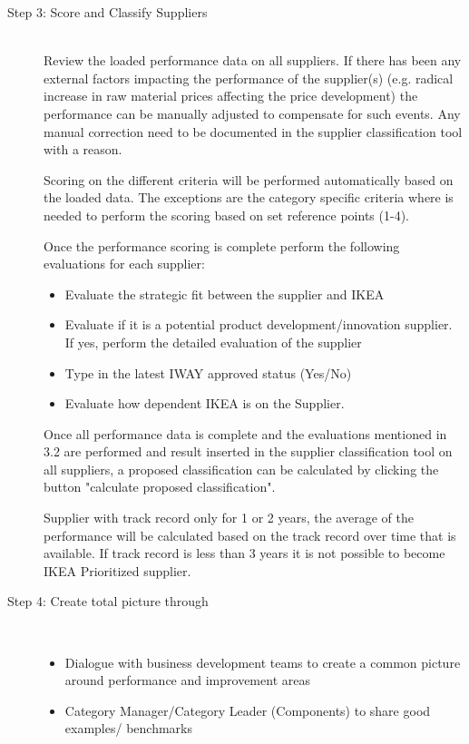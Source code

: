 \documentclass[oneside,12pt]{article}%
\begin{document}
\begin{description}
  \item[Step 3: Score and Classify Suppliers] \hfill \\
  Review the loaded performance data on all suppliers. If there has been any external factors impacting the performance of the supplier(s) (e.g. radical increase in raw material prices affecting the price development) the performance can be manually adjusted to compensate for such events. Any manual correction need to be documented in the supplier classification tool with a reason. \par
  Scoring on the different criteria will be performed automatically based on the loaded data. The exceptions are the category specific criteria where is needed to perform the scoring based on set reference points (1-4). \par
  Once the performance scoring is complete perform the following evaluations for each supplier:
  \begin{itemize}
    \item Evaluate the strategic fit between the supplier and IKEA
    \item Evaluate if it is a potential product development/innovation supplier. If yes, perform the detailed evaluation of the supplier
    \item Type in the latest IWAY approved status (Yes/No)
    \item Evaluate how dependent IKEA is on the Supplier.
  \end{itemize}

  Once all performance data is complete and the evaluations mentioned in 3.2 are performed and result inserted in the supplier classification tool on all suppliers, a proposed classification can be calculated by clicking the button "calculate proposed classification". \par
  Supplier with track record only for 1 or 2 years, the average of the performance will be calculated based on the track record over time that is available. If track record is less than 3 years it is not possible to become IKEA Prioritized supplier.

  \item[Step 4: Create total picture through] \hfill \\
  \begin{itemize}
    \item Dialogue with business development teams to create a common picture around performance and improvement areas
    \item Category Manager/Category Leader (Components) to share good examples/ benchmarks
  \end{itemize}


\end{description}
\end{document}
